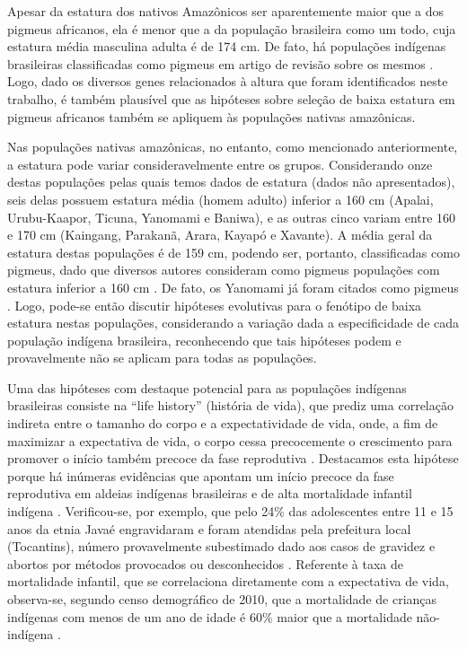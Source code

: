 Apesar da estatura dos nativos Amazônicos ser aparentemente maior que a dos pigmeus africanos, ela é menor que a da população brasileira como um todo, cuja estatura média masculina adulta é de 174 cm. De fato, há populações indígenas brasileiras classificadas como pigmeus em artigo de revisão sobre os mesmos \cite{perry_evolution_2009}. Logo, dado os diversos genes relacionados à altura que foram identificados neste trabalho, é também plausível que as hipóteses sobre seleção de baixa estatura em pigmeus africanos também se apliquem às populações nativas amazônicas.

Nas populações nativas amazônicas, no entanto, como mencionado anteriormente, a estatura pode variar consideravelmente entre os grupos. Considerando onze destas populações pelas quais temos dados de estatura (dados não apresentados), seis delas possuem estatura média (homem adulto) inferior a 160 cm (Apalai, Urubu-Kaapor, Ticuna, Yanomami e Baniwa), e as outras cinco variam  entre 160 e 170 cm (Kaingang, Parakanã, Arara, Kayapó e Xavante). A média geral da estatura destas populações é de 159 cm, podendo ser, portanto, classificadas como pigmeus, dado que diversos autores consideram como pigmeus populações com estatura inferior a 160 cm \cite{cavalli-sforza_african_1986,perry_evolution_2009,verdu_african_2016}. De fato, os Yanomami já foram citados como pigmeus \cite{perry_evolution_2009}.  Logo, pode-se então discutir hipóteses evolutivas para o fenótipo de baixa estatura nestas populações, considerando a variação dada a especificidade de cada população indígena brasileira, reconhecendo que tais hipóteses podem e provavelmente não se aplicam para todas as populações.

Uma das hipóteses com destaque potencial para as populações indígenas brasileiras consiste na “life history” (história de vida), que prediz uma correlação indireta entre o tamanho do corpo e a expectatividade de vida, onde, a fim de maximizar a expectativa de vida, o corpo cessa precocemente o crescimento para promover o início também precoce da fase reprodutiva \cite{walker_growth_2006,migliano_life_2007}. Destacamos esta hipótese porque há inúmeras evidências que apontam um início precoce da fase reprodutiva em aldeias indígenas brasileiras \cite{igansi_gestacao_2018,lima_iniciacao_2018} e de alta mortalidade infantil indígena \cite{coimbra_jr_epidemiologia_2003}. Verificou-se, por exemplo, que pelo 24\% das adolescentes entre 11 e 15 anos da etnia Javaé engravidaram e foram atendidas pela prefeitura local (Tocantins), número provavelmente subestimado dado aos casos de gravidez e abortos por métodos provocados ou desconhecidos \cite{santiago_plano_2017}. Referente à taxa de mortalidade infantil, que se correlaciona diretamente com a expectativa de vida, observa-se, segundo censo demográfico de 2010, que a mortalidade de crianças indígenas com menos de um ano de idade é 60\% maior que a mortalidade não-indígena \cite{marinho_mortalidade_2019}.

